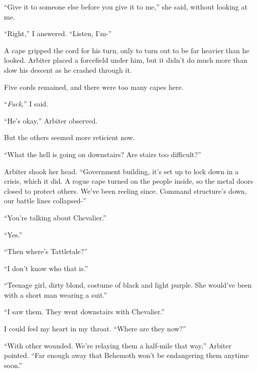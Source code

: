``Give it to someone else before you give it to me,'' she said, without looking at me.



``Right,'' I answered.  ``Listen, I'm-''



A cape gripped the cord for his turn, only to turn out to be far heavier than he looked.  Arbiter placed a forcefield under him, but it didn't do much more than slow his descent as he crashed through it.



Five cords remained, and there were too many capes here.



``\emph{Fuck},'' I said.



``He's okay,'' Arbiter observed.



But the others seemed more reticient now.



``What the hell is going on downstairs?  Are stairs too difficult?''



Arbiter shook her head.  ``Government building, it's set up to lock down in a crisis, which it did.  A rogue cape turned on the people inside, so the metal doors closed to protect others.  We've been reeling since.  Command structure's down, our battle lines collapsed-''



``You're talking about Chevalier.''



``Yes.''



``Then where's Tattletale?''



``I don't know who that is.''



``Teenage girl, dirty blond, costume of black and light purple.  She would've been with a short man wearing a suit.''



``I saw them.  They went downstairs with Chevalier.''



I could feel my heart in my throat.  ``Where are they now?''



``With other wounded.  We're relaying them a half-mile that way,'' Arbiter pointed.  ``Far enough away that Behemoth won't be endangering them anytime soon.''



